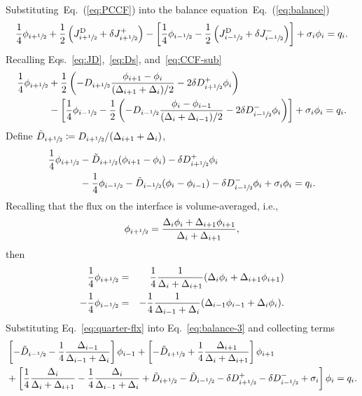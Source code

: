 \documentclass[%
superscriptaddress,
 amsmath,amssymb,
]{revtex4-2}
\newcommand{\eq}[1]{Eq.~(\ref{#1})}
\newcommand{\jp}{\ensuremath{J^+}}
\newcommand{\jm}{\ensuremath{J^-}}
\newcommand{\jD}{\ensuremath{J^{\textrm{\scriptsize{D}}}}}
\newcommand{\hzi}{\ensuremath{\sfrac{1}{2}}}
\begin{document}
Substituting~\eq{eq:PCCF} into the balance equation~\eq{eq:balance}
\begin{equation}
\label{eq:balance+jpm}
\frac{1}{4} \phi_{i+\hzi} + \frac{1}{2}
\left(\jD_{i+\hzi} + \delta \jp_{i+\hzi}\right)
-\left[
\frac{1}{4} \phi_{i-\hzi} - \frac{1}{2}
\left(\jD_{i-\hzi} + \delta \jm_{i-\hzi}\right)
\right]
+\sigma_i\phi_i = q_i.
\end{equation}
Recalling Eqs.~\eqref{eq:JD},~\eqref{eq:Ds}, and~\eqref{eq:CCF-sub}
\begin{align}
\label{eq:balance-2}
\frac{1}{4} \phi_{i+\hzi} &+ \frac{1}{2}
\left(
- D_{i+\hzi}
\frac{\phi_{i+1} - \phi_{i}}{(\Delta_{i+1} + \Delta_i)/2}  -2\delta D^+ _{i+\hzi} \phi_i
\right) \nonumber \\
&-\left[
\frac{1}{4} \phi_{i-\hzi} - \frac{1}{2}
\left(
- D_{i-\hzi}
\frac{\phi_{i} - \phi_{i-1}}{(\Delta_{i} + \Delta_{i-1})/2}
 -2\delta D^- _{i-\hzi} \phi_{i}
 \right)
\right]
+\sigma_i\phi_i = q_i.
\end{align}
Define $\tilde{D}_{i+\hzi}\coloneqq D_{i+\hzi} / (\Delta_{i+1}+\Delta_i)$, 
\begin{align}
\label{eq:balance-3}
\frac{1}{4} \phi_{i+\hzi} 
&-\tilde{D}_{i+\hzi}(\phi_{i+1} - \phi_{i})
  -\delta D^+ _{i+\hzi} \phi_i
\nonumber \\
&-\frac{1}{4} \phi_{i-\hzi} 
- \tilde{D}_{i-\hzi}(\phi_{i} - \phi_{i-1}) 
-\delta D^- _{i-\hzi} \phi_{i}
+\sigma_i\phi_i = q_i.
\end{align}
Recalling that the flux on the interface is volume-averaged, i.e.,
\begin{equation}
\label{eq:flxs}
\phi_{i+\hzi} = \frac{\Delta_i \phi_{i} + \Delta_{i+1} \phi_{i+1}}
{\Delta_i + \Delta_{i+1}},
\end{equation} 
then
\begin{eqnarray}
\label{eq:quarter-flx}
\frac{1}{4} \phi_{i+\hzi} &=& \frac{1}{4} \frac{1}{\Delta_i + \Delta_{i+1}}
(\Delta_i \phi_{i} + \Delta_{i+1} \phi_{i+1}) \nonumber \\
-\frac{1}{4} \phi_{i-\hzi} &=& -\frac{1}{4} \frac{1}{\Delta_{i-1} + \Delta_{i}}
(\Delta_{i-1} \phi_{i-1} + \Delta_{i} \phi_{i}) .
\end{eqnarray}
Substituting Eq.~\eqref{eq:quarter-flx} into Eq.~\eqref{eq:balance-3} and collecting terms
\begin{align}
\label{eq:balance-4}
&\left[
- \tilde{D}_{i-\hzi} - \frac{1}{4} \frac{\Delta_{i-1}}{\Delta_{i-1} + \Delta_{i}}
\right] \phi_{i-1} 
+ 
\left[
- \tilde{D}_{i+\hzi} + \frac{1}{4} \frac{\Delta_{i+1}}{\Delta_{i} + \Delta_{i+1}}
\right] \phi_{i+1} \nonumber \\
&+	
\left[
\frac{1}{4} \frac{\Delta_{i}}{\Delta_{i} + \Delta_{i+1}}
- \frac{1}{4} \frac{\Delta_{i}}{\Delta_{i-1} + \Delta_{i}}
+\tilde{D}_{i+\hzi}
-\tilde{D}_{i-\hzi}
-\delta D^+ _{i+\hzi}
-\delta D^- _{i-\hzi}
+ \sigma_i
\right] \phi_i = q_i .
\end{align}

\end{document}
